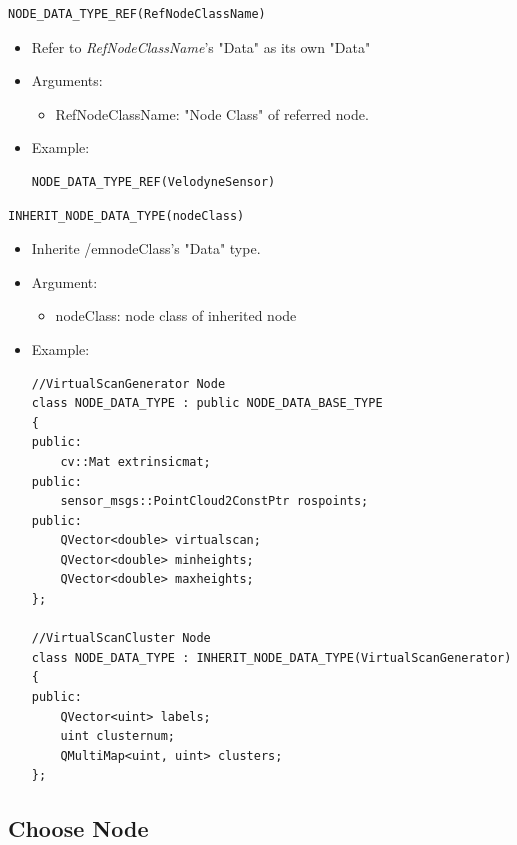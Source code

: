 \documentclass[a4paper,10pt]{book}
\begin{document}
\begin{mdframed}
\begin{verbatim}
NODE_DATA_TYPE_REF(RefNodeClassName)
\end{verbatim}
\begin{itemize}
 \item Refer to {\em{RefNodeClassName}}'s "Data" as its own "Data"
 \item Arguments:
 \begin{itemize}
  \item RefNodeClassName: "Node Class" of referred node.
 \end{itemize}
 \item Example:
 \begin{verbatim}
NODE_DATA_TYPE_REF(VelodyneSensor)
 \end{verbatim}
\end{itemize}
\end{mdframed}

\begin{mdframed}
\begin{verbatim}
INHERIT_NODE_DATA_TYPE(nodeClass)
\end{verbatim}
\begin{itemize}
 \item Inherite {/em{nodeClass}}'s "Data" type.
 \item Argument:
 \begin{itemize}
  \item nodeClass: node class of inherited node
 \end{itemize}
 \item Example:
 \begin{verbatim}
//VirtualScanGenerator Node
class NODE_DATA_TYPE : public NODE_DATA_BASE_TYPE
{
public:
    cv::Mat extrinsicmat;
public:
    sensor_msgs::PointCloud2ConstPtr rospoints;
public:
    QVector<double> virtualscan;
    QVector<double> minheights;
    QVector<double> maxheights;
};

//VirtualScanCluster Node
class NODE_DATA_TYPE : INHERIT_NODE_DATA_TYPE(VirtualScanGenerator)
{
public:
    QVector<uint> labels;
    uint clusternum;
    QMultiMap<uint, uint> clusters;
};
 \end{verbatim}
\end{itemize}
\end{mdframed}

\subsection{Choose Node}
\end{document}
